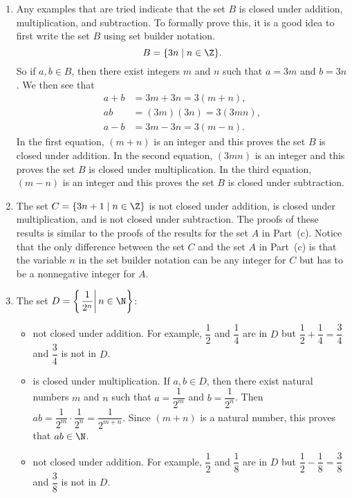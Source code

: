 \documentclass[11pt]{article}
\begin{document}
\begin{enumerate}
  \item Any examples that are tried indicate that the set $B$ is closed under addition, multiplication, and subtraction.  To formally prove this, it is a good idea to first write the set $B$ using set builder notation.
\[
B = \{ 3n \mid n \in \Z \}.
\]
So if $a, b \in B$, then there exist integers $m$ and $n$ such that $a = 3m$ and $b = 3n$.  We then see that
\begin{align*}
a + b &= 3m + 3n = 3(m + n), \\
 a b  &= (3m)(3n) = 3(3mn), \\
a - b &= 3m - 3n = 3(m - n).
\end{align*}
In the first equation, $(m + n)$ is an integer and this proves the set $B$ is closed under addition.  In the second equation, $(3mn)$ is an integer and this proves the set $B$ is closed under multiplication. In the third equation, $(m - n)$ is an integer and this proves the set $B$ is closed under subtraction.

\item The set $C = \{ 3n + 1 \mid n \in \Z \}$ is not closed under addition, is closed under multiplication, and is not closed under subtraction.  The proofs of these results is similar to the proofs of the results for the set $A$ in Part~(c).  Notice that the only difference between the set $C$ and the set $A$ in Part~(c) is that the variable $n$ in the set builder notation can be any integer for $C$ but has to be a nonnegative integer for $A$.

\item The set $D = \left\{ \left. \dfrac{1}{2^n} \right| n \in \N \right\}$:
\begin{itemize}
\item not closed under addition.  For example, $\dfrac{1}{2}$ and $\dfrac{1}{4}$ are in $D$ but $\dfrac{1}{2} + \dfrac{1}{4} = \dfrac{3}{4}$ and $\dfrac{3}{4}$ is not in $D$.
\item is closed under multiplication.  If $a, b \in D$, then there exist natural numbers $m$ and $n$ such that 
$a = \dfrac{1}{2^m}$ and $b = \dfrac{1}{2^n}$. Then $ab = \dfrac{1}{2^m} \cdot \dfrac{1}{2^n} = \dfrac{1}{2^{m+n}}$.  Since $(m + n)$ is a natural number, this proves that $ab \in \N$.
\item not closed under addition.  For example, $\dfrac{1}{2}$ and $\dfrac{1}{8}$ are in $D$ but $\dfrac{1}{2} - \dfrac{1}{8} = \dfrac{3}{8}$ and $\dfrac{3}{8}$ is not in $D$.

\end{itemize}

\end{enumerate}
\end{document}
